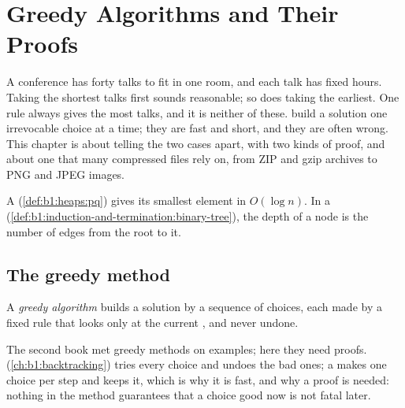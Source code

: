 \chapter{Greedy Algorithms and Their Proofs}\label{ch:b1:greedy-proofs}

A conference has forty talks to fit in one room, and each talk has fixed hours. Taking the shortest talks first sounds
reasonable; so does taking the earliest. One rule always gives the most talks, and it is neither of these.  build a solution one irrevocable choice at a time; they are fast and short, and they are often wrong. This
chapter is about telling the two cases apart, with two kinds of proof, and about one  that many
compressed files rely on, from ZIP and gzip archives to PNG and JPEG images.

\begin{recall}
A  (\cref{def:b1:heaps:pq}) gives its smallest element in $O(\log n)$. In a 
(\cref{def:b1:induction-and-termination:binary-tree}), the depth of a node is the number of edges from the root to it.
\end{recall}

\section{The greedy method}\label{sec:b1:greedy-proofs:method}

\begin{definition}\label{def:b1:greedy-proofs:greedy}
A \emph{greedy algorithm} builds a solution by a sequence of choices, each made by a fixed rule
that looks only at the current , and never undone.
\end{definition}

The second book met greedy methods on examples; here they need proofs.  (\cref{ch:b1:backtracking}) tries
every choice and undoes the bad ones; a  makes one choice per step and keeps it, which is why it is
fast, and why a proof is needed: nothing in the method guarantees that a choice good now is not fatal later.

